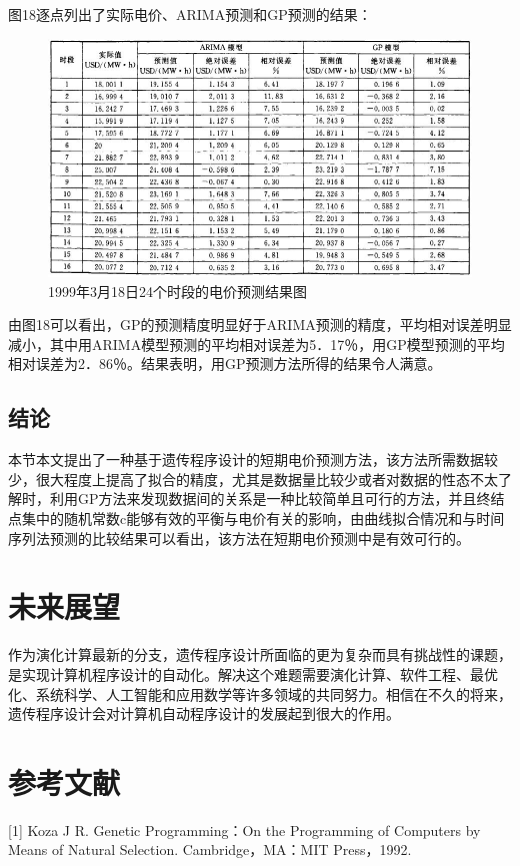 \documentclass[UTF8]{ctexart}
\begin{document}
\newpage
图18逐点列出了实际电价、ARIMA预测和GP预测的结果：
	\begin{figure}[ht]
		\centering	
		\includegraphics[scale=0.6]{images/example_result_table.png}
		\caption{1999年3月18日24个时段的电价预测结果图}
		\label{fig:label}
	\end{figure}

由图18可以看出，GP的预测精度明显好于ARIMA预测的精度，平均相对误差明显减小，其中用ARIMA模型预测的平均相对误差为5．17％，用GP模型预测的平均相对误差为2．86％。结果表明，用GP预测方法所得的结果令人满意。

\subsection{结论}
本节本文提出了一种基于遗传程序设计的短期电价预测方法，该方法所需数据较少，很大程度上提高了拟合的精度，尤其是数据量比较少或者对数据的性态不太了解时，利用GP方法来发现数据间的关系是一种比较简单且可行的方法，并且终结点集中的随机常数c能够有效的平衡与电价有关的影响，由曲线拟合情况和与时间序列法预测的比较结果可以看出，该方法在短期电价预测中是有效可行的。

\section{未来展望}
作为演化计算最新的分支，遗传程序设计所面临的更为复杂而具有挑战性的课题，是实现计算机程序设计的自动化。解决这个难题需要演化计算、软件工程、最优化、系统科学、人工智能和应用数学等许多领域的共同努力。相信在不久的将来，遗传程序设计会对计算机自动程序设计的发展起到很大的作用。

\newpage
\section{参考文献}
[1] Koza J R. Genetic Programming：On the Programming of Computers by Means of Natural Selection. Cambridge，MA：MIT Press，1992.
\end{document}
